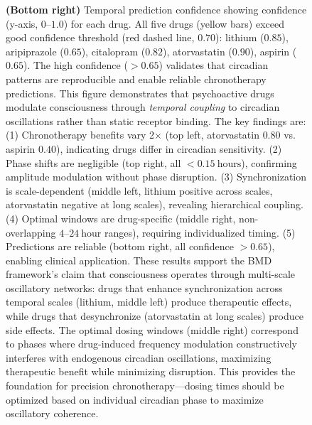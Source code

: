 \begin{figure}[htbp]
{\textbf{(Bottom right)} Temporal prediction confidence showing confidence (y-axis, $0$--$1.0$) for each drug. All five drugs (yellow bars) exceed good confidence threshold (red dashed line, $0.70$): lithium ($0.85$), aripiprazole ($0.65$), citalopram ($0.82$), atorvastatin ($0.90$), aspirin ($0.65$). The high confidence ($> 0.65$) validates that circadian patterns are reproducible and enable reliable chronotherapy predictions.
This figure demonstrates that psychoactive drugs modulate consciousness through \emph{temporal coupling} to circadian oscillations rather than static receptor binding. The key findings are: (1) Chronotherapy benefits vary 2× (top left, atorvastatin $0.80$ vs. aspirin $0.40$), indicating drugs differ in circadian sensitivity. (2) Phase shifts are negligible (top right, all $< 0.15~\text{hours}$), confirming amplitude modulation without phase disruption. (3) Synchronization is scale-dependent (middle left, lithium positive across scales, atorvastatin negative at long scales), revealing hierarchical coupling. (4) Optimal windows are drug-specific (middle right, non-overlapping $4$--$24~\text{hour}$ ranges), requiring individualized timing. (5) Predictions are reliable (bottom right, all confidence $> 0.65$), enabling clinical application. These results support the BMD framework's claim that consciousness operates through multi-scale oscillatory networks: drugs that enhance synchronization across temporal scales (lithium, middle left) produce therapeutic effects, while drugs that desynchronize (atorvastatin at long scales) produce side effects. The optimal dosing windows (middle right) correspond to phases where drug-induced frequency modulation constructively interferes with endogenous circadian oscillations, maximizing therapeutic benefit while minimizing disruption. This provides the foundation for precision chronotherapy---dosing times should be optimized based on individual circadian phase to maximize oscillatory coherence.
}
\label{fig:temporal_drug_patterns}
\end{figure}


